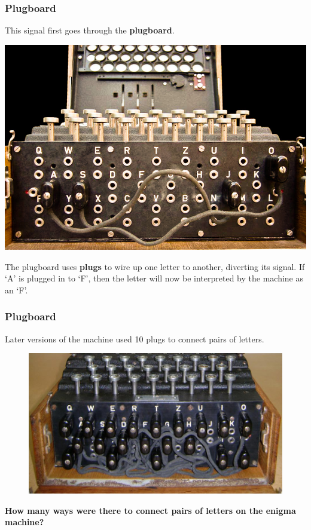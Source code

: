 \documentclass{beamer}
\newcommand{\<}{\langle}
\renewcommand{\>}{\rangle}
\begin{document}
\begin{frame}
\frametitle{Plugboard}

This signal first goes through the \textbf{plugboard}.
\begin{center}
\includegraphics[scale=.7]{IMG/plugboard}
\end{center}
The plugboard uses \textbf{plugs} to wire up one letter to another, diverting its signal. If `A' is plugged in to `F', then the letter will now be interpreted by the machine as an `F'.
\end{frame}


\begin{frame}
\frametitle{Plugboard}

Later versions of the machine used 10 plugs to connect pairs of letters.
\begin{figure}
\includegraphics[scale=.2]{IMG/plugboard2}
\end{figure}

\textbf{How many ways were there to connect pairs of letters on the enigma machine?}
\end{frame}
\end{document}

